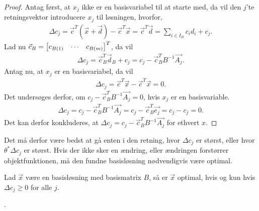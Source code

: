 \begin{proof}
Antag først, at $x_j$ ikke er en basisvariabel til at starte med, da vil den $j$'te retningsvektor introducere $x_j$ til løsningen, hvorfor,
\begin{align*}
\Delta c_j = \vec{c}^T(\vec{x}+ \vec{d}) - \vec{c}^T\vec{x} = \vec{c}^T\vec{d} = \sum_{i \in I_B} c_i d_i + c_j.
\end{align*}
Lad nu $\vec{c}_B = \begin{bmatrix} c_{B(1)}& \cdots & c_{B(m)} \end{bmatrix}^T$, da vil
\begin{align*}
\Delta c_j =\vec{c}_B^T\vec{d}_B+ c_j = c_j-\vec{c}_B^T B^{-1}\vec{A_j}.
\end{align*}
Antag nu, at $x_j$ er en basisvariabel, da vil 
\begin{align*}
\Delta c_j = \vec{c}^T\vec{x}- \vec{c}^T\vec{x} = 0.
\end{align*}
Det undersøges derfor, om $ c_j-\vec{c}_B^T B^{-1}\vec{A_j}= 0$, hvis $x_j$ er en basisvariable.
\begin{align*}
 \Delta c_j = c_j-\vec{c}_B^T B^{-1}\vec{A_j} = c_j - \vec{c}_B^T \vec{e_j} = c_j - c_j = 0.
\end{align*}
Det kan derfor konkluderes, at $\Delta c_j = c_j-\vec{c}_B^T B^{-1}\vec{A_j}$ for ethvert $x$.
\end{proof}

Det må derfor være bedst at gå enten i den retning, hvor $\Delta c_j$ er størst, eller hvor $\theta^*\Delta c_j$ er størst. 
Hvis der ikke sker en ændring, eller ændringen forstørrer objektfunktionen, må den fundne basisløsning nødvendigvis være optimal.

\begin{stn}
Lad $\vec{x}$ være en basisløsning med basismatrix $B$, så er $\vec{x}$ optimal, hvis og kun hvis $\Delta c_j \geq 0$ for alle $j$.
\label{stn:optimalDeltaC}
\end{stn}.

